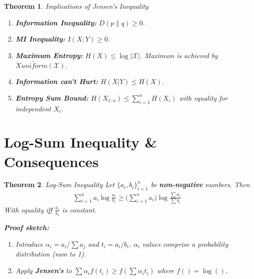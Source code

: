 \documentclass[a4paper,12pt]{report}
\newtheorem{theorem}{Theorem}
\begin{document}
\begin{theorem}{Implications of Jensen's Inequality}
\begin{enumerate}
\item \textbf{Information Inequality: } $D(p\| q) \geq 0$.
\item \textbf{MI Inequality: } $I(X; Y) \geq 0$.
\item \textbf{Maximum Entropy: } $H(X) \leq \log |\mathcal X|$. Maximum is
achieved by $X\tilde {uniform} (\mathcal X)$.
\item \textbf{Information can't Hurt: } $H(X|Y) \leq H(X)$.
\item \textbf{Entropy Sum Bound: } $H(X_{1:n}) \leq \sum_{i=1}^{n} H(X_i)$ with
equality for independent $X_i$.
\end{enumerate}
\end{theorem}



\section{Log-Sum Inequality \& Consequences}

\begin{theorem}{Log-Sum Inequality}
Let $\{a_i, b_i\}_{i=1}^n$ be \textbf{non-negative} numbers. Then 
\begin{align}
\sum_{i=1}^{n} a_i \log \frac{a_i}{b_i} \geq \big(\sum_{i=1}^{n} a_i \big) \log
\frac{\sum a_i}{\sum b_i} 
\end{align}
With equality iff $\frac{a_i}{b_i}$ is constant.

\textbf{Proof sketch: } 
\begin{enumerate}
\item Introduce $\alpha_i = a_i/\sum a_j$ and $t_i = a_i/b_i$. $\alpha_i$ values
comprise a probability distribution (sum to 1). 
\item Apply \textbf{Jensen's} to $\sum \alpha_i f(t_i) \geq f(\sum \alpha_i
t_i)$ where $f() = \log()$.
\end{enumerate}
\end{theorem}
\end{document}

